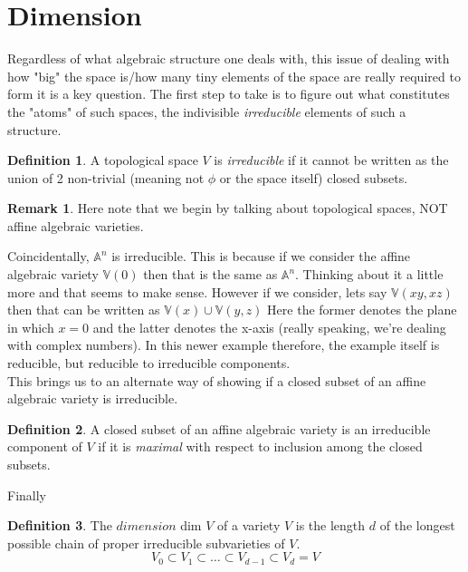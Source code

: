 \documentclass[12pt]{book}
\theoremstyle{definition}
\newtheorem*{definition}{Definition}
\newtheorem*{remark}{Remark}
\begin{document}
\section{Dimension}
Regardless of what algebraic structure one deals with, this issue of dealing with how "big" the space is/how many tiny elements of the space are really required to form it is a key question. The first step to take is to figure out what constitutes the "atoms" of such spaces, the indivisible \textit{irreducible} elements of such a structure.
\begin{definition}
    A topological space $V$ is \textit{irreducible} if it cannot be written as the union of 2 non-trivial (meaning not $\phi$ or the space itself) closed subsets.
\end{definition}
\begin{remark}
    Here note that we begin by talking about topological spaces, NOT affine algebraic varieties.
\end{remark}
Coincidentally, $\mathbb{A}^n$ is irreducible. This is because if we consider the affine algebraic variety $\mathbb{V}(0)$ then that is the same as $\mathbb{A}^n$. Thinking about it a little more and that seems to make sense. However if we consider, lets say $\mathbb{V}(xy, xz)$ then that can be written as $\mathbb{V}(x) \cup \mathbb{V}(y, z)$ Here the former denotes the plane in which $x=0$ and the latter denotes the x-axis (really speaking, we're dealing with complex numbers). In this newer example therefore, the example itself is reducible, but reducible to irreducible components. \\
This brings us to an alternate way of showing if a closed subset of an affine algebraic variety is irreducible.
\begin{definition}
    A closed subset of an affine algebraic variety is an irreducible component of $V$ if it is \textit{maximal} with respect to inclusion among the closed subsets.
\end{definition}
Finally
\begin{definition}
    The $dimension$ dim $V$ of a variety $V$ is the length $d$ of the longest possible chain of proper irreducible subvarieties of $V$. 
    $$V_0 \subset V_1 \subset \ldots \subset V_{d-1} \subset V_d = V $$
\end{definition}
\end{document}
